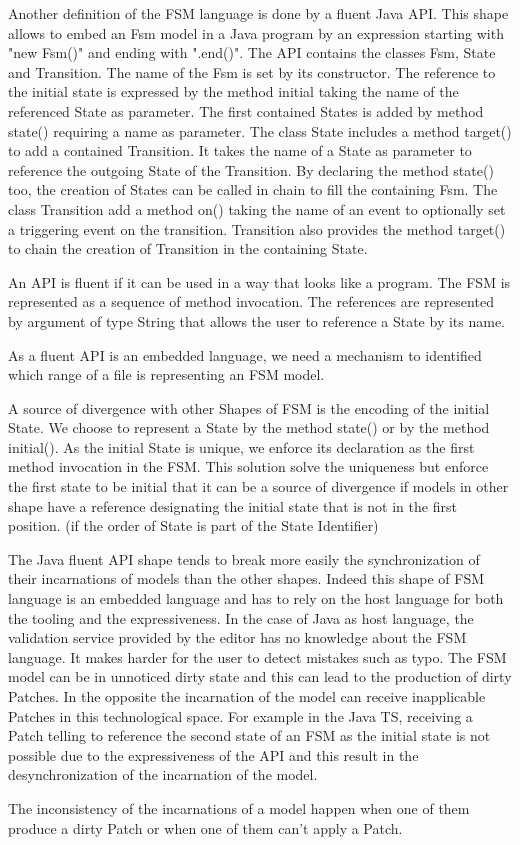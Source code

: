 Another definition of the FSM language is done by a fluent Java API.
This shape allows to embed an Fsm model in a Java program by an expression starting with "new Fsm()" and ending with ".end()".
The API contains the classes Fsm, State and Transition.
The name of the Fsm is set by its constructor.
The reference to the initial state is expressed by the method initial taking the name of the referenced State as parameter.
The first contained States is added by method state() requiring a name as parameter.
The class State includes a method target() to add a contained Transition. It takes the name of a State as parameter to reference the outgoing State of the Transition.
By declaring the method state() too, the creation of States can be called in chain to fill the containing Fsm.
The class Transition add a method on() taking the name of an event to optionally set a triggering event on the transition.
Transition also provides the method target() to chain the creation of Transition in the containing State.

An API is fluent if it can be used in a way that looks like a program.
The FSM is represented as a sequence of method invocation.
The references are represented by argument of type String that allows the user to reference a State by its name.

As a fluent API is an embedded language, we need a mechanism to identified which range of a file is representing an FSM model.

A source of divergence with other Shapes of FSM is the encoding of the initial State.
We choose to represent a State by the method state() or by the method initial().
As the initial State is unique, we enforce its declaration as the first method invocation in the FSM. This solution solve the uniqueness but enforce the first state to be initial that it can be a source of divergence if models in other shape have a reference designating the initial state that is not in the first position. (if the order of State is part of the State Identifier)

The Java fluent API shape tends to break more easily the synchronization of their incarnations of models than the other shapes.
Indeed this shape of FSM language is an embedded language and has to rely on the host language for both the tooling and the expressiveness.
In the case of Java as host language, the validation service provided by the editor has no knowledge about the FSM language.
It makes harder for the user to detect mistakes such as typo. The FSM model can be in unnoticed dirty state and this can lead to the production of dirty Patches.
In the opposite the incarnation of the model can receive inapplicable Patches in this technological space.
For example in the Java TS, receiving a Patch telling to reference the second state of an FSM as the initial state is not possible due to the expressiveness of the API and this result in the desynchronization of the incarnation of the model.

The inconsistency of the incarnations of a model happen when one of them produce a dirty Patch or when one of them can't apply a Patch.
